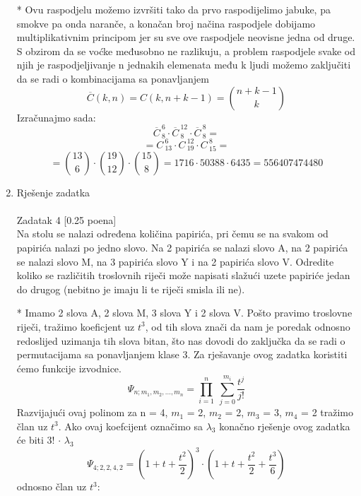 \documentclass[12pt]{article}
\begin{document}
\begin{enumerate}
* Ovu raspodjelu možemo izvršiti tako da prvo raspodijelimo jabuke, pa
smokve pa onda naranče, a konačan broj načina raspodjele dobijamo multiplikativnim 
principom jer su sve ove raspodjele neovisne jedna od druge. S
obzirom da se voćke međusobno ne razlikuju, a problem raspodjele svake od
njih je raspodjeljivanje n jednakih elemenata među k ljudi možemo zaključiti
da se radi o kombinacijama sa ponavljanjem
\begin{equation*}
   \overline{C}(k, n) = C(k, n+k-1) =  {{n+k-1}\choose{k}}
\end{equation*}
Izračunajmo sada:
\begin{equation*}
   \overline{C}_{~8}^{~6} \cdot \overline{C}_{~8}^{~12} \cdot \overline{C}_{~8}^{~8} = 
\end{equation*}
\begin{equation*}
   = C_{~13}^{~6} \cdot C_{~19}^{~12} \cdot C_{~15}^{~8} =
\end{equation*}
\begin{equation*}
   = {{13}\choose{6}} \cdot {{19}\choose{12}} \cdot {{15}\choose{8}} = 1716 \cdot 50388 \cdot 6435 = 556407474480
\end{equation*}

		\item Rješenje zadatka \\
		\\
		Zadatak 4 [0.25 poena] \\
		
Na stolu se nalazi određena količina papirića, pri čemu se na svakom od
papirića nalazi po jedno slovo. Na 2 papirića se nalazi slovo A, na 2 papirića se
nalazi slovo M, na 3 papirića slovo Y i na 2 papirića slovo V. Odredite koliko se
različitih troslovnih riječi može napisati slažući uzete papiriće jedan do drugog
(nebitno je imaju li te riječi smisla ili ne).

        \newpage
* Imamo 2 slova A, 2 slova M, 3 slova Y i 2 slova V. Pošto pravimo troslovne
riječi, tražimo koeficjent uz $t^3$, od tih slova znači da nam je poredak odnosno redoslijed uzimanja tih
slova bitan, što nas dovodi do zaključka da se radi o permutacijama sa ponavljanjem 
klase 3. Za rješavanje ovog zadatka koristiti ćemo funkcije izvodnice.
\begin{equation*}
   \Psi_{n;m_1,m_2,...,m_n} = \prod_{i=1}^{n} ~ \sum_{j=0}^{m_i} \frac{t^j}{j!}
\end{equation*}
Razvijajući ovaj polinom za n = 4, $m_1$ = 2, $m_2$ = 2, $m_3$ = 3, $m_4$ = 2
tražimo član uz $t^3$. Ako ovaj koefcijent označimo sa ${\lambda_3}$ konačno rješenje ovog
zadatka će biti 3! ${\cdot}$ ${\lambda_3}$ 
\begin{equation*}
   \Psi_{4;2,2,4,2} = (1+t+\frac{t^2}{2})^{3} \cdot (1+t+ \frac{t^2}{2}+ \frac{t^3}{6})
\end{equation*}
odnosno član uz $t^3$:


\end{enumerate}
\end{document}
